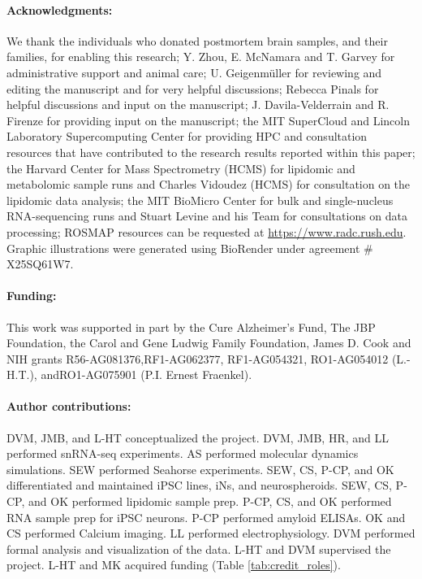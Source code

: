 \paragraph{Acknowledgments:} We thank the individuals who donated postmortem brain samples, and their families, for enabling this research; Y. Zhou, E. McNamara and T. Garvey for administrative support and animal care; U. Geigenmüller for reviewing and editing the manuscript and for very helpful discussions; Rebecca Pinals for helpful discussions and input on the manuscript; J. Davila-Velderrain and R. Firenze for providing input on the manuscript; the MIT SuperCloud and Lincoln Laboratory Supercomputing Center for providing HPC and consultation resources that have contributed to the research results reported within this paper; the Harvard Center for Mass Spectrometry (HCMS) for lipidomic and metabolomic sample runs and Charles Vidoudez (HCMS) for consultation on the lipidomic data analysis; the MIT BioMicro Center for bulk and single-nucleus RNA-sequencing runs and Stuart Levine and his Team for consultations on data processing; ROSMAP resources can be requested at \url{https://www.radc.rush.edu}. Graphic illustrations were generated using BioRender under agreement \# X25SQ61W7.

\paragraph{Funding:} This work was supported in part by the Cure Alzheimer’s Fund, The JBP Foundation, the Carol and Gene Ludwig Family Foundation, James D. Cook and NIH grants R56-AG081376,RF1-AG062377, RF1-AG054321, RO1-AG054012 (L.-H.T.), andRO1-AG075901 (P.I. Ernest Fraenkel).

\paragraph{Author contributions:} DVM, JMB, and L-HT conceptualized the project. DVM, JMB, HR, and LL performed snRNA-seq experiments. AS performed molecular dynamics simulations. SEW performed Seahorse experiments. SEW, CS, P-CP, and OK differentiated and maintained iPSC lines, iNs, and neurospheroids. SEW, CS, P-CP, and OK performed lipidomic sample prep. P-CP, CS, and OK performed RNA sample prep for iPSC neurons. P-CP performed amyloid ELISAs. OK and CS performed Calcium imaging. LL performed electrophysiology. DVM performed formal analysis and visualization of the data. L-HT and DVM supervised the project. L-HT and MK acquired funding (Table \ref{tab:credit_roles}).


